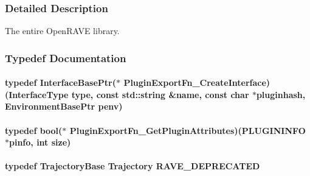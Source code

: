 \subsubsection{Detailed Description}
The entire OpenRAVE library. 

\subsubsection{Typedef Documentation}
\hypertarget{namespaceOpenRAVE_afd22dd103475de7006afbd1511a60ac4}{
\paragraph[{PluginExportFn\_\-CreateInterface}]{\setlength{\rightskip}{0pt plus 5cm}typedef InterfaceBasePtr($\ast$ {\bf PluginExportFn\_\-CreateInterface})(InterfaceType type, const std::string \&name, const char $\ast$pluginhash, EnvironmentBasePtr penv)}\hfill}
\label{namespaceOpenRAVE_afd22dd103475de7006afbd1511a60ac4}
\hypertarget{namespaceOpenRAVE_a79dd40a56ad2aaee2fbb678a709e2572}{
\paragraph[{PluginExportFn\_\-GetPluginAttributes}]{\setlength{\rightskip}{0pt plus 5cm}typedef bool($\ast$ {\bf PluginExportFn\_\-GetPluginAttributes})({\bf PLUGININFO} $\ast$pinfo, int size)}\hfill}
\label{namespaceOpenRAVE_a79dd40a56ad2aaee2fbb678a709e2572}
\hypertarget{namespaceOpenRAVE_af23fc4c2c72950a8c02f38ef71680bc6}{
\paragraph[{RAVE\_\-DEPRECATED}]{\setlength{\rightskip}{0pt plus 5cm}typedef {\bf TrajectoryBase} Trajectory {\bf RAVE\_\-DEPRECATED}}\hfill}
\label{namespaceOpenRAVE_af23fc4c2c72950a8c02f38ef71680bc6}


